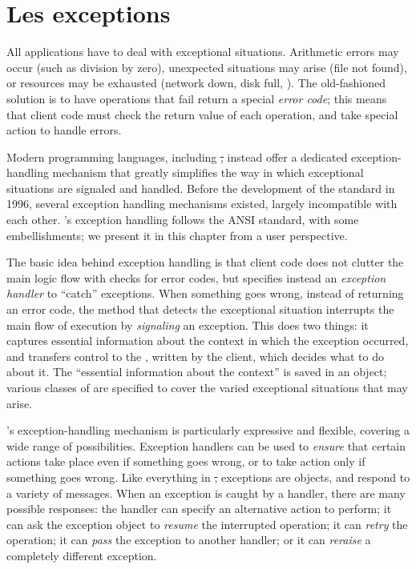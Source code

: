 \documentclass[a4paper,10pt,twoside]{book}
\begin{document}
	\renewcommand{\nnbb}[2]{} %
	\sloppy
\fi

\chapter{Les exceptions}

All applications have to deal with exceptional situations.
Arithmetic errors may occur (such as division by zero), unexpected situations may arise (file not found), or resources may be exhausted (network down, disk full, \etc).
The old-fashioned solution is to have operations that fail return a special \emph{error code}; this means that client code must check the return value of each operation, and take special action to handle errors.

Modern programming languages, including \st, instead offer a dedicated exception-handling mechanism that greatly simplifies the way in which exceptional situations are signaled and handled.
Before the development of the  standard in 1996, several  exception handling mechanisms existed, largely incompatible with each other. \pharo's exception handling follows the ANSI standard, with some embellishments; we present it in this chapter from a user perspective.

The basic idea behind exception handling is that 
client code does not clutter the main logic flow with checks for error codes, but specifies instead an \emph{exception handler} to ``catch'' exceptions.
When something goes wrong, instead of returning an error code, the method that detects the exceptional situation interrupts the main flow of execution by  \emph{signaling} an exception.
This does two things: it captures essential information about the context in which the exception occurred, and transfers control to the , written by the client, which decides what to do about it.
The ``essential information about the context'' is saved in an  object; 
various classes of  are specified to cover the varied exceptional situations that may arise.

\pharo's exception-handling mechanism is particularly expressive and flexible, covering a wide range of possibilities. Exception handlers can be used to \emph{ensure} that certain actions take place even if something goes wrong, or to take action only if something goes wrong.
Like everything in \st, exceptions are objects, and respond to a variety of messages.
When an exception is caught by a handler, there are many possible responses: the  handler can specify an alternative action to perform; it can ask the exception object to \emph{resume} the interrupted operation; it can \emph{retry} the operation; it can \emph{pass} the exception to another handler; or it can \emph{reraise} a completely different exception.
\end{document}
